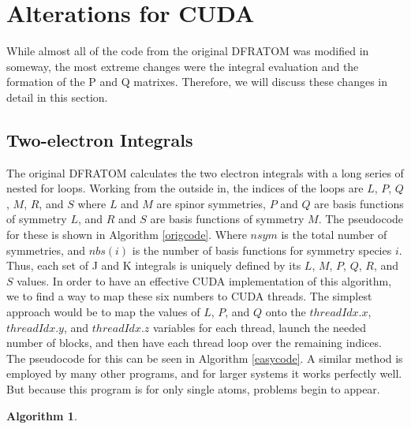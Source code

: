 \documentclass[12pt]{report}
\newtheorem{algorithm}[theorem]{Algorithm}
\begin{document}
\section{Alterations for CUDA}
While almost all of the code from the original DFRATOM was modified in someway, the most extreme changes were the integral evaluation and the formation of the P and Q matrixes. Therefore, we will discuss these changes in detail in this section.

\subsection{Two-electron Integrals}
The original DFRATOM calculates the two electron integrals with a long series of nested for loops. Working from the outside in, the indices of the loops are $L$, $P$, $Q$, $M$, $R$, and $S$ where $L$ and $M$ are spinor symmetries, $P$ and $Q$ are basis functions of symmetry $L$, and $R$ and $S$ are basis functions of symmetry $M$. The pseudocode for these is shown in Algorithm \ref{origcode}. Where $nsym$ is the total number of symmetries, and $nbs(i)$ is the number of basis functions for symmetry species $i$. Thus, each set of J and K integrals is uniquely defined by its $L$, $M$, $P$, $Q$, $R$, and $S$ values. In order to have an effective CUDA implementation of this algorithm, we to find a way to map these six numbers to CUDA threads. The simplest approach would be to map the values of $L$, $P$, and $Q$ onto the $threadIdx.x$, $threadIdx.y$, and $threadIdx.z$ variables for each thread, launch the needed number of blocks, and then have each thread loop over the remaining indices. The pseudocode for this can be seen in Algorithm \ref{easycode}. A similar method is employed by many other programs, and for larger systems it works perfectly well. But because this program is for only single atoms, problems begin to appear.

\begin{algorithm}
\caption{The original }
\label{origcode}
\begin{algorithmic}
				\ELSE
				\ENDIF
					\ELSE
					\ENDIF
					\ENDFOR
				\ENDFOR
			\ENDFOR
		\ENDFOR
	\ENDFOR
\ENDFOR
\end{algorithmic}
\end{algorithm}
\end{document}
